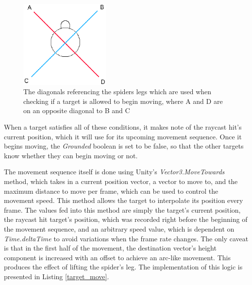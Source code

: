 \begin{figure}[tp]
    \centering
    \captionsetup{justification=centering}
    \includegraphics[width=0.4\textwidth]{grafika/diagonals2.eps}
    \caption{The diagonals referencing the spiders legs which are used when
    checking if a target is allowed to begin moving, where A and D are on an
opposite diagonal to B and C}
    \label{fig:diagonals}
\end{figure}

When a target satisfies all of these conditions, it makes note of the raycast
hit's current position, which it will use for its upcoming movement sequence.
Once it begins moving, the \textit{Grounded} boolean is set to be false, so that
the other targets know whether they can begin moving or not.

The movement sequence itself is done using Unity's \textit{Vector3.MoveTowards}
method, which takes in a current position vector, a vector to move to, and the
maximum distance to move per frame, which can be used to control the movement
speed. This method allows the target to interpolate its position every frame.
The values fed into this method are simply the target's current position, the
raycast hit target's position, which was recorded right before the beginning of
the movement sequence, and an arbitrary speed value, which is dependent on
\textit{Time.deltaTime} to avoid variations when the frame rate changes. The
only caveat is that in the first half of the movement, the destination vector's
height component is increased with an offset to achieve an arc-like movement.
This produces the effect of lifting the spider's leg. The implementation of this
logic is presented in Listing \ref{target_move}.

